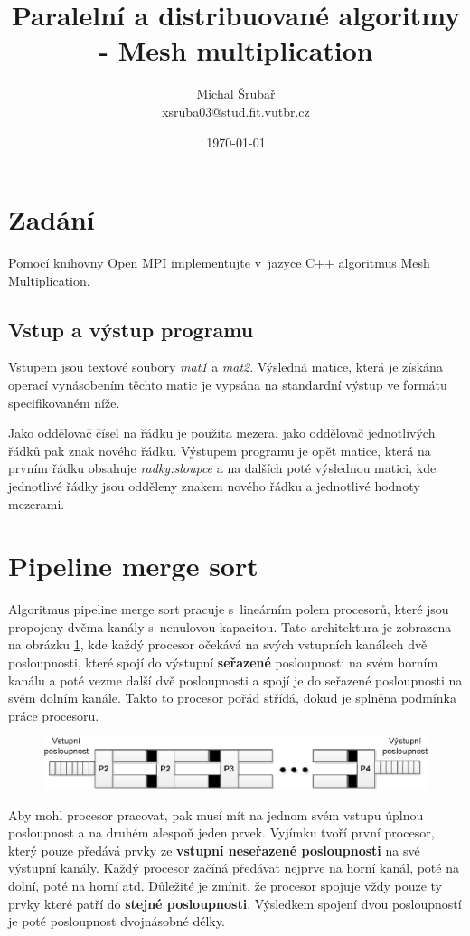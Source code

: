 \documentclass[10pt,a4paper,notitlepage]{article}
\author{Michal Šrubař\\xsruba03@stud.fit.vutbr.cz}
\date{\today}
\title{Paralelní a distribuované algoritmy - Mesh multiplication}
\begin{document}
\maketitle

\section{Zadání}
Pomocí knihovny Open MPI implementujte v~jazyce C++ algoritmus Mesh Multiplication. 

\subsection{Vstup a výstup programu}
Vstupem jsou textové soubory \textit{mat1} a \textit{mat2}.  Výsledná matice,
která je získána operací vynásobením těchto matic je vypsána na standardní
výstup ve formátu specifikovaném níže.

Jako oddělovač čísel na řádku je použita mezera, jako oddělovač jednotlivých
řádků pak znak nového řádku. Výstupem programu je opět matice, která na prvním
řádku obsahuje \textit{radky:sloupce} a na dalších poté výslednou matici, kde
jednotlivé řádky jsou odděleny znakem nového řádku a jednotlivé hodnoty
mezerami.

\section{Pipeline merge sort}
Algoritmus pipeline merge sort pracuje s~lineárním polem procesorů, které jsou
propojeny dvěma kanály s~nenulovou kapacitou. Tato architektura je zobrazena na
obrázku \ref{pic:3}, kde každý procesor očekává na svých vstupních kanálech dvě
posloupnosti, které spojí do výstupní \textbf{seřazené} posloupnosti na svém horním
kanálu a poté vezme další dvě posloupnosti a spojí je do seřazené posloupnosti
na svém dolním kanále. Takto to procesor pořád střídá, dokud je splněna podmínka
práce procesoru.

\begin{figure}[h]
	\centering
	\includegraphics{pms-arch.eps}
  \label{pic:3}
\end{figure}


Aby mohl procesor pracovat, pak musí mít na jednom svém vstupu úplnou
posloupnost a na druhém alespoň jeden prvek. Vyjímku tvoří první procesor, který
pouze předává prvky ze \textbf{vstupní neseřazené posloupnosti} na své výstupní
kanály. Každý procesor začíná předávat nejprve na horní kanál, poté na dolní,
poté na horní atd. Důležité je zmínit, že procesor spojuje vždy pouze ty prvky
které patří do \textbf{stejné posloupnosti}. Výsledkem spojení dvou posloupností
je poté posloupnost dvojnásobné délky.
\end{document}
